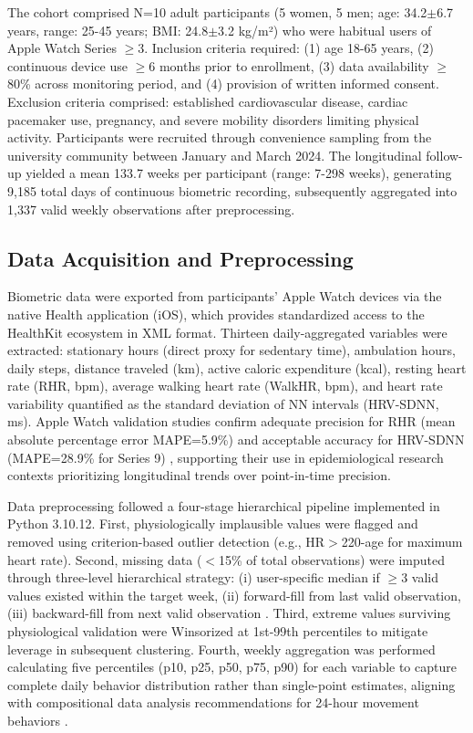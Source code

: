 \documentclass[journal,twoside,web]{ieeecolor}
\begin{document}
The cohort comprised N=10 adult participants (5 women, 5 men; age: 34.2$\pm$6.7 years, range: 25-45 years; BMI: 24.8$\pm$3.2 kg/m²) who were habitual users of Apple Watch Series $\geq$3. Inclusion criteria required: (1) age 18-65 years, (2) continuous device use $\geq$6 months prior to enrollment, (3) data availability $\geq$80\% across monitoring period, and (4) provision of written informed consent. Exclusion criteria comprised: established cardiovascular disease, cardiac pacemaker use, pregnancy, and severe mobility disorders limiting physical activity. Participants were recruited through convenience sampling from the university community between January and March 2024. The longitudinal follow-up yielded a mean 133.7 weeks per participant (range: 7-298 weeks), generating 9,185 total days of continuous biometric recording, subsequently aggregated into 1,337 valid weekly observations after preprocessing.

\subsection{Data Acquisition and Preprocessing}
\label{subsec:acquisition}

Biometric data were exported from participants' Apple Watch devices via the native Health application (iOS), which provides standardized access to the HealthKit ecosystem in XML format. Thirteen daily-aggregated variables were extracted: stationary hours (direct proxy for sedentary time), ambulation hours, daily steps, distance traveled (km), active caloric expenditure (kcal), resting heart rate (RHR, bpm), average walking heart rate (WalkHR, bpm), and heart rate variability quantified as the standard deviation of NN intervals (HRV-SDNN, ms). Apple Watch validation studies confirm adequate precision for RHR (mean absolute percentage error MAPE=5.9\%) and acceptable accuracy for HRV-SDNN (MAPE=28.9\% for Series 9) \cite{OGrady2024AppleWatch,Khushhal2025AppleCardiac}, supporting their use in epidemiological research contexts prioritizing longitudinal trends over point-in-time precision.

Data preprocessing followed a four-stage hierarchical pipeline implemented in Python 3.10.12. First, physiologically implausible values were flagged and removed using criterion-based outlier detection (e.g., HR$>$220-age for maximum heart rate). Second, missing data ($<$15\% of total observations) were imputed through three-level hierarchical strategy: (i) user-specific median if $\geq$3 valid values existed within the target week, (ii) forward-fill from last valid observation, (iii) backward-fill from next valid observation \cite{Little1988,Azur2011}. Third, extreme values surviving physiological validation were Winsorized at 1st-99th percentiles to mitigate leverage in subsequent clustering. Fourth, weekly aggregation was performed calculating five percentiles (p10, p25, p50, p75, p90) for each variable to capture complete daily behavior distribution rather than single-point estimates, aligning with compositional data analysis recommendations for 24-hour movement behaviors \cite{Chastin2015,Dumuid2018}.
\end{document}

